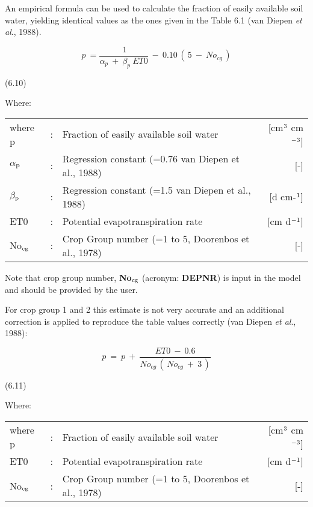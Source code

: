  An empirical formula can be used to calculate the fraction of easily available soil water,
yielding identical values as the ones given in the Table 6.1 (van Diepen {\it et al\/}., 1988).

\begin{equation}
p~={\frac{~1}{ \alpha _{p} ~+~ \beta _{p} ~ET0}} ~-~ 0.10\, (\, 5~-~No _{cg} \, )
\end{equation}

 
\strut\hfill (6.10)

Where:\\
\begin{tabularx}{\textwidth}{llXr}



where p &:& Fraction of easily available soil water  & [cm$^{{\rm 3}}$ cm$^{{\rm -3}}$]\\
$\alpha$$_{{\rm p}}$ &:& Regression constant {\small (=0.76 van Diepen et al., 1988)}  & [-]\\
$\beta$$_{{\rm p}}$ &:& Regression constant {\small (=1.5 van Diepen et al., 1988)}  & [d cm-$^{{\rm 1}}$]\\
ET0 &:& Potential evapotranspiration rate  & [cm d$^{{\rm -1}}$]\\
No$_{{\rm cg}}$ &:& Crop Group number {\small (=1 to 5, Doorenbos et al., 1978)}  & [-]
\end{tabularx}

 
Note that crop group number, {\bf No$_{{\rm cg}}$} (acronym: {\bf DEPNR}) is input in the model and should
be provided by the user.



For crop group 1 and 2 this estimate is not very accurate and an additional correction is
applied to reproduce the table values correctly (van Diepen {\it et al\/}., 1988):

\begin{equation}
p~=~p~+~{\frac{ET0 ~-~ 0.6}{No _{cg} \, (\, No _{cg} ~+~3\, )}}
\end{equation}

 
\strut\hfill (6.11)

Where:\\
\begin{tabularx}{\textwidth}{llXr}



where p &:& Fraction of easily available soil water  & [cm$^{{\rm 3}}$ cm$^{{\rm -3}}$]\\
ET0 &:& Potential evapotranspiration rate  & [cm d$^{{\rm -1}}$]\\
No$_{{\rm cg}}$ &:& Crop Group number {\small (=1 to 5, Doorenbos et al., 1978)}  & [-]
\end{tabularx}



